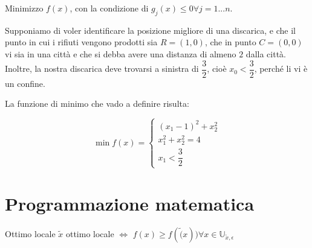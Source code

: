 \documentclass[\main/main.tex]{subfiles}
\begin{document}
Minimizzo $f(x)$, con la condizione di $g_j(x) \leq 0 \forall j = 1...n $.

Supponiamo di voler identificare la posizione migliore di una discarica, e che il punto in cui i rifiuti vengono prodotti sia $R = (1,0)$, che in punto $C = (0,0)$ vi sia in una città e che si debba avere una distanza di almeno $2$ dalla città. Inoltre, la nostra discarica deve trovarsi a sinistra di $\dfrac{3}{2}$, cioè $x_0 < \dfrac{3}{2}$, perché li vi è un confine.

\begin{center}
\end{center}

La funzione di minimo che vado a definire risulta:

\[
	\min f(x) = \begin{cases}
		(x_1-1)^2 + x_2^2 \\
		x_1^2 + x_2^2 = 4 \\
		x_1  < \dfrac{3}{2}
	\end{cases}
\]

\begin{figure}
\end{figure}


\section{Programmazione matematica}

\begin{definition}{Ottimo locale}
	$\widetilde{x}$ ottimo locale $\Leftrightarrow$ $f(x) \geq f(\widetilde(x)) \forall x \in \mathbb{U}_{\widetilde{x}, \epsilon}$
\end{definition}
\end{document}
